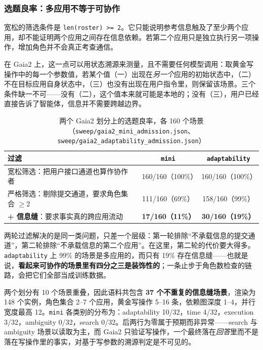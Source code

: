 \documentclass[UTF8,11pt,fontset=fandol]{ctexart}
\begin{document}
\subsubsection*{选题良率：多应用不等于可协作}

宽松的筛选条件是 \texttt{len(roster) >= 2}。它只能说明参考信息触及了至少两个应用，却不能证明两个应用之间存在信息依赖。若第二个应用只是独立执行另一项操作，增加角色并不会真正考查通信。

在 Gaia2 上，这一点可以用状态溯源来测量，且不需要任何模型调用：取黄金写操作中的每一个参数值，若某个值（一）出现在\emph{另一个}应用的初始状态中，（二）不在目标应用自身状态中，（三）也没有出现在用户指令里，则保留该场景。三个条件缺一不可——没有（二），这个值本来就可能是本地的；没有（三），用户已经直接告诉了智能体，信息并不需要跨越边界。

\begin{table}[H]
\centering
\small
\caption{两个 Gaia2 划分上的选题良率，各 160 个场景（\texttt{sweep/gaia2\_mini\_admission.json}、\texttt{sweep/gaia2\_adaptability\_admission.json}）}
\label{tab:selection}
\begin{tabularx}{\textwidth}{X c c}
\toprule
过滤 & \texttt{mini} & \texttt{adaptability}\\
\midrule
宽松筛选：把用户接口通道也算作协作者 & 160/160（100\%） & 160/160（100\%）\\
严格筛选：剔除提交通道，要求角色集合 $\geq2$ & 111/160（69\%） & 158/160（99\%）\\
\textbf{+ 信息缝}：要求事实真的跨应用流动 & \textbf{17/160（11\%）} & \textbf{30/160（19\%）}\\
\bottomrule
\end{tabularx}
\end{table}

两轮过滤解决的是同一类问题，只差一个层级：第一轮排除“不承载信息的提交通道”，第二轮排除“不承载信息的第二个应用”。在这里，第二轮的代价要大得多。\texttt{adaptability} 上 99\% 的场景是多应用的，而只有 19\% 存在信息缝——也就是说，\textbf{看起来可协作的场景里有四分之三是装饰性的}；一条止步于角色数检查的链路，会把它们全部当成训练数据。

两个划分有 10 个场景重叠，因此语料共包含 \textbf{37 个不重复的信息缝场景}，渲染为 148 个实例，角色集合 2--7 个应用，黄金写操作 5--16 条，依赖图深度 1--4，并行宽度最高 12。\texttt{mini} 各类别的分布为：adaptability 10/32，time 4/32，execution 3/32，ambiguity 0/32，search 0/32。后两行为零属于预期而非异常——search 与 ambiguity 场景以读取为主，而 Gaia2 只验证写操作，一个最终落在\emph{回答}里而不是落在写操作里的事实，对基于写参数的溯源判定是不可见的。
\end{document}
